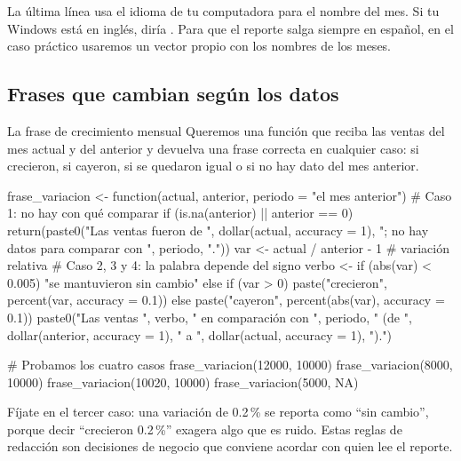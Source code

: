 La última línea usa el idioma de tu computadora para el nombre del mes. Si
tu Windows está en inglés, diría . Para que el reporte
salga siempre en español, en el caso práctico usaremos un vector propio con
los nombres de los meses.

\subsection{Frases que cambian según los datos}

\begin{ejemplo}{La frase de crecimiento mensual}
Queremos una función que reciba las ventas del mes actual y del anterior y
devuelva una frase correcta en cualquier caso: si crecieron, si cayeron, si
se quedaron igual o si no hay dato del mes anterior.
\end{ejemplo}

\begin{rcode}
frase_variacion <- function(actual, anterior, periodo = "el mes anterior") {
  # Caso 1: no hay con qué comparar
  if (is.na(anterior) || anterior == 0) {
    return(paste0("Las ventas fueron de ", dollar(actual, accuracy = 1),
                  "; no hay datos para comparar con ", periodo, "."))
  }
  var <- actual / anterior - 1                   # variación relativa
  # Caso 2, 3 y 4: la palabra depende del signo
  verbo <- if (abs(var) < 0.005) {
    "se mantuvieron sin cambio"
  } else if (var > 0) {
    paste("crecieron", percent(var, accuracy = 0.1))
  } else {
    paste("cayeron", percent(abs(var), accuracy = 0.1))
  }
  paste0("Las ventas ", verbo, " en comparación con ", periodo, " (de ",
         dollar(anterior, accuracy = 1), " a ",
         dollar(actual, accuracy = 1), ").")
}

# Probamos los cuatro casos
frase_variacion(12000, 10000)
frase_variacion(8000, 10000)
frase_variacion(10020, 10000)
frase_variacion(5000, NA)
\end{rcode}

Fíjate en el tercer caso: una variación de 0.2\,\% se reporta como ``sin
cambio'', porque decir ``crecieron 0.2\,\%'' exagera algo que es ruido. Estas
reglas de redacción son decisiones de negocio que conviene acordar con quien
lee el reporte.

